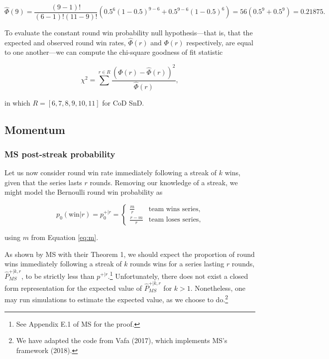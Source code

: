 \documentclass{article}
\begin{document}
\[
\hat{\Phi}(9) = \frac{(9 - 1)!}{(6 - 1)!(11 - 9)!}(0.5^{6}(1 - 0.5)^{9 - 6} + 0.5^{9 - 6}(1 - 0.5)^6) = 56 (0.5^9 + 0.5^9) = 0.21875.
\]

To evaluate the constant round win probability null hypothesis---that
is, that the expected and observed round win rates, \(\hat{\Phi}(r)\)
and \(\Phi(r)\) respectively, are equal to one another---we can compute
the chi-square goodness of fit statistic

\begin{equation}\label{eq:chi-squ}
\chi^2 = \sum^{r \in R} \frac{(\Phi(r) - \hat{\Phi}(r))^2}{\hat{\Phi}(r)},
\end{equation}

in which \(R = [6, 7, 8, 9, 10, 11]\) for CoD SnD.

\hypertarget{momentum}{%
\subsection{Momentum}\label{momentum}}

\hypertarget{ms-post-streak-probability}{%
\subsubsection{MS post-streak
probability}\label{ms-post-streak-probability}}

Let us now consider round win rate immediately following a streak of
\(k\) wins, given that the series lasts \(r\) rounds. Removing our
knowledge of a streak, we might model the Bernoulli round win
probability as

\begin{equation}\label{eq:pwr}
p_0(\text{win} | r) = p^{+|r}_0 = \begin{cases} 
\frac{m}{r} & \text{team wins series}, \\ 
\frac{r - m}{r} & \text{team loses series},
\end{cases}
\end{equation}

using \(m\) from Equation \ref{eq:m}.

As shown by MS with their Theorem 1, we should expect the proportion of
round wins immediately following a streak of \(k\) rounds wins for a
series lasting \(r\) rounds, \(\hat{P}^{+|k,r}_{MS}\), to be strictly
less than \(p^{+|r}\).\footnote{See Appendix E.1 of MS for the proof.}
Unfortunately, there does not exist a closed form representation for the
expected value of \(\hat{P}^{+|k,r}_{MS}\) for \(k > 1\). Nonetheless,
one may run simulations to estimate the expected value, as we choose to
do.\footnote{We have adapted the code from Vafa (2017), which implements
  MS's framework (2018).}
\end{document}
